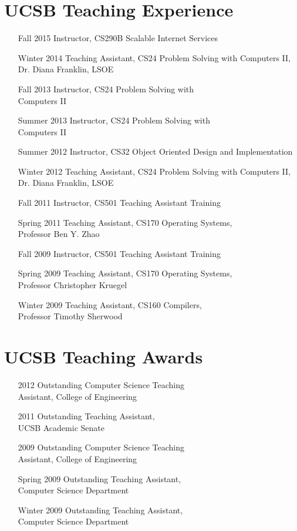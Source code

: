 \documentclass[10pt,letterpaper,oneside,twocolumn]{article}
\begin{document}
\section{UCSB Teaching Experience}
\begin{itemize}
  \item [Fall 2015] Instructor, CS290B Scalable Internet Services
  \item [Winter 2014] Teaching Assistant, CS24 Problem Solving with Computers
    II, Dr. Diana Franklin, LSOE
  \item [Fall 2013] Instructor, CS24 Problem Solving with\\ Computers II
  \item [Summer 2013] Instructor, CS24 Problem Solving with\\ Computers II
  \item [Summer 2012] Instructor, CS32 Object Oriented Design and
    Implementation
  \item [Winter 2012] Teaching Assistant, CS24 Problem Solving with Computers
    II, Dr. Diana Franklin, LSOE
  \item [Fall 2011] Instructor, CS501 Teaching Assistant Training
  \item [Spring 2011] Teaching Assistant, CS170 Operating Systems,\\ Professor
    Ben Y. Zhao
  \item [Fall 2009] Instructor, CS501 Teaching Assistant Training
  \item [Spring 2009] Teaching Assistant, CS170 Operating Systems,\\ Professor
    Christopher Kruegel
  \item [Winter 2009] Teaching Assistant, CS160 Compilers,\\ Professor Timothy
    Sherwood
\end{itemize}


\section{UCSB Teaching Awards}
\begin{itemize}
  \item [2012] Outstanding Computer Science Teaching\\ Assistant, College of
    Engineering
  \item [2011] Outstanding Teaching Assistant,\\ UCSB Academic Senate
  \item [2009] Outstanding Computer Science Teaching\\ Assistant, College of
    Engineering
  \item [Spring 2009] Outstanding Teaching Assistant,\\ Computer Science
    Department
  \item [Winter 2009] Outstanding Teaching Assistant,\\ Computer Science
    Department
\end{itemize}
\end{document}
